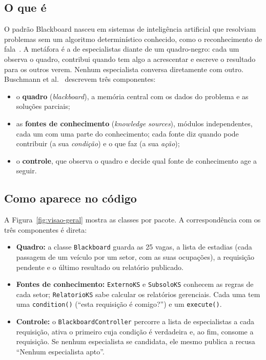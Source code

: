 \subsection{O que é}

O padrão Blackboard nasceu em sistemas de inteligência artificial que resolviam problemas sem um algoritmo determinístico conhecido, como o reconhecimento de fala~\cite{nii1986}. A metáfora é a de especialistas diante de um quadro-negro: cada um observa o quadro, contribui quando tem algo a acrescentar e escreve o resultado para os outros verem. Nenhum especialista conversa diretamente com outro. Buschmann et al.~\cite{buschmann1996} descrevem três componentes:

\begin{itemize}
  \item o \textbf{quadro} (\emph{blackboard}), a memória central com os dados do problema e as soluções parciais;
  \item as \textbf{fontes de conhecimento} (\emph{knowledge sources}), módulos independentes, cada um com uma parte do conhecimento; cada fonte diz quando pode contribuir (a sua \emph{condição}) e o que faz (a sua \emph{ação});
  \item o \textbf{controle}, que observa o quadro e decide qual fonte de conhecimento age a seguir.
\end{itemize}

\subsection{Como aparece no código}

A Figura~\ref{fig:visao-geral} mostra as classes por pacote. A correspondência com os três componentes é direta:

\begin{itemize}
  \item \textbf{Quadro:} a classe \texttt{Blackboard} guarda as 25 vagas, a lista de estadias (cada passagem de um veículo por um setor, com as suas ocupações), a requisição pendente e o último resultado ou relatório publicado.
  \item \textbf{Fontes de conhecimento:} \texttt{ExternoKS} e \texttt{SubsoloKS} conhecem as regras de cada setor; \texttt{RelatorioKS} sabe calcular os relatórios gerenciais. Cada uma tem uma \texttt{condition()} (``esta requisição é comigo?'') e um \texttt{execute()}.
  \item \textbf{Controle:} o \texttt{BlackboardController} percorre a lista de especialistas a cada requisição, ativa o primeiro cuja condição é verdadeira e, ao fim, consome a requisição. Se nenhum especialista se candidata, ele mesmo publica a recusa ``Nenhum especialista apto''.
\end{itemize}

